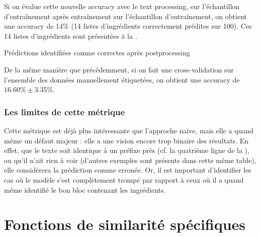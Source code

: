                 Si on évalue cette nouvelle accuracy avec le text processing, sur l'échantillon d'entraînement après entraînement sur l'échantillon d'entraînement, on obtient une accuracy de 14\% (14 listes d'ingrédients correctement prédites sur 100).
                Ces 14 listes d'ingrédients sont présentées à la .

               {\renewcommand{\arraystretch}{1.5}%
                \begin{table}
                    \begin{spacing}{1.0}
                    \begin{center}
                    {\scriptsize
                    
                    }
                    \caption{Prédictions identifiées comme correctes après postprocessing}
                    \label{tbl:GT_postprocessed_corrects}
                    \end{center}
                    \end{spacing}
                \end{table}
                }

                De la même manière que précédemment, si on fait une cross-validation sur l'ensemble des données manuellement étiquetées, on obtient une accuracy de $16.60\% \pm 3.35\%$.

                \subsubsection{Les limites de cette métrique}

                Cette métrique est déjà plus intéressante que l'approche naïve, mais elle a quand même un défaut majeur : elle a une vision encore trop binaire des résultats.
                En effet, que le texte soit identique à un préfixe près (cf. la quatrième ligne de la ), ou qu'il n'ait rien à voir (d'autres exemples sont présents dans cette même table), elle considèrera la prédiction comme erronée.
                Or, il est important d'identifier les cas où le modèle s'est complètement trompé par rapport à ceux où il a quand même identifié le bon bloc contenant les ingrédients.

        \section{Fonctions de \og similarité \fg spécifiques}

